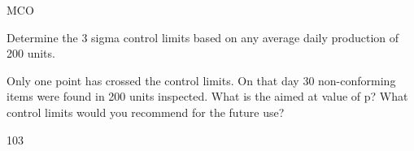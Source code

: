\documentclass{rvcepaper}
\begin{document}
\begin{iempaper}
\begin{cietablemc}{M}{CO}
{\begin{romi}
\item Determine the 3 sigma control limits based on any average daily production of 200 units.
\item Only one point has crossed the control limits. On that day 30 non-conforming items were found in 200 units inspected. What is the aimed at value of p? What control limits would you recommend for the future use?
\end{romi}}{10}{3}
\end{cietablemc}
\end{iempaper}
\end{document}
